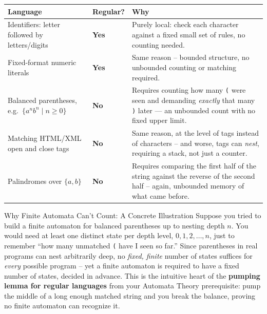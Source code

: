 \documentclass[full-course-notes.tex]{subfiles}
\begin{document}
\begin{center}
\renewcommand{\arraystretch}{1.4}
\begin{tabularx}{\textwidth}{@{}X l X@{}}
\toprule
\textbf{Language} & \textbf{Regular?} & \textbf{Why} \\
\midrule
Identifiers: letter followed by letters/digits & \textbf{Yes} & Purely local: check each
character against a fixed small set of rules, no counting needed. \\
Fixed-format numeric literals & \textbf{Yes} & Same reason -- bounded structure, no unbounded
counting or matching required. \\
Balanced parentheses, e.g.\ $\{a^{n}b^{n} \mid n \ge 0\}$ & \textbf{No} & Requires counting how
many \texttt{(} were seen and demanding \emph{exactly} that many \texttt{)} later --- an
unbounded count with no fixed upper limit. \\
Matching HTML/XML open and close tags & \textbf{No} & Same reason, at the level of tags instead
of characters -- and worse, tags can \emph{nest}, requiring a stack, not just a counter. \\
Palindromes over $\{a,b\}$ & \textbf{No} & Requires comparing the first half of the string
against the reverse of the second half -- again, unbounded memory of what came before. \\
\bottomrule
\end{tabularx}
\end{center}

\begin{examplebox}{Why Finite Automata Can't Count: A Concrete Illustration}
Suppose you tried to build a finite automaton for balanced parentheses up to nesting depth $n$.
You would need at least one distinct state per depth level, $0, 1, 2, \dots, n$, just to
remember ``how many unmatched \texttt{(} have I seen so far.'' Since parentheses in real
programs can nest arbitrarily deep, no \emph{fixed, finite} number of states suffices for
\emph{every} possible program -- yet a finite automaton is required to have a fixed number of
states, decided in advance. This is the intuitive heart of the \textbf{pumping lemma for regular
languages} from your Automata Theory prerequisite: pump the middle of a long enough matched
string and you break the balance, proving no finite automaton can recognize it.
\end{examplebox}
\end{document}

